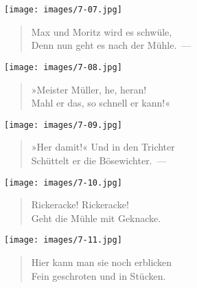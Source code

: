 \documentclass[a4paper,12pt]{article}
\begin{document}
\begin{center}\texttt{[image: images/7-07.jpg]}\end{center}



\begin{verse}
Max und Moritz wird es schwüle,\\{}
Denn nun geht es nach der Mühle.~—
\end{verse}



\begin{center}\texttt{[image: images/7-08.jpg]}\end{center}



\begin{verse}
»Meister Müller, he, heran!\\{}
Mahl er das, so schnell er kann!«
\end{verse}



\begin{center}\texttt{[image: images/7-09.jpg]}\end{center}



\begin{verse}
»Her damit!« Und in den Trichter\\{}
Schüttelt er die Bösewichter.~—
\end{verse}



\begin{center}\texttt{[image: images/7-10.jpg]}\end{center}



\begin{verse}
Rickeracke! Rickeracke!\\{}
Geht die Mühle mit Geknacke.
\end{verse}



\begin{center}\texttt{[image: images/7-11.jpg]}\end{center}



\begin{verse}
Hier kann man sie noch erblicken\\{}
Fein geschroten und in Stücken.
\end{verse}
\end{document}
